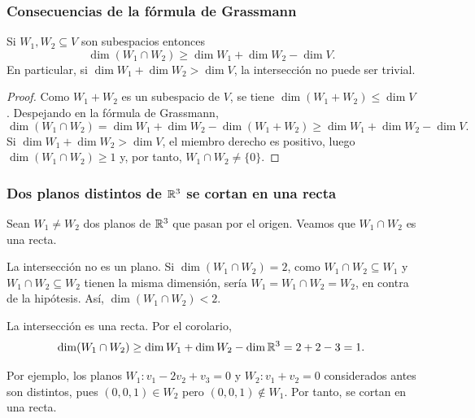 \begin{frame}
    \frametitle{Consecuencias de la fórmula de Grassmann}

    \begin{corollary}
        Si $W_1,W_2\subseteq V$ son subespacios entonces
        \[
            \dim(W_1\cap W_2)\geq\dim W_1+\dim W_2-\dim V.
        \]
        En particular, si $\dim W_1+\dim W_2>\dim V$, la intersección
        no puede ser trivial.
    \end{corollary}

    \begin{proof}
        Como $W_1+W_2$ es un subespacio de $V$, se tiene
        $\dim(W_1+W_2)\leq\dim V$. Despejando en la fórmula de Grassmann,
        \[
            \dim(W_1\cap W_2)=\dim W_1+\dim W_2-\dim(W_1+W_2)
            \geq\dim W_1+\dim W_2-\dim V.
        \]
        Si $\dim W_1+\dim W_2>\dim V$, el miembro derecho es positivo, luego
        $\dim(W_1\cap W_2)\geq1$ y, por tanto, $W_1\cap W_2\neq\{0\}$.
    \end{proof}
\end{frame}


\begin{frame}
    \frametitle{Dos planos distintos de $\mathbb{R}^3$ se cortan en una recta}

    \begin{example}
        Sean $W_1\neq W_2$ dos planos de $\mathbb{R}^3$ que pasan por el origen.
        Veamos que $W_1\cap W_2$ es una recta.
    \end{example}

    \alert{La intersección no es un plano.} Si $\dim(W_1\cap W_2)=2$, como
    $W_1\cap W_2\subseteq W_1$ y $W_1\cap W_2\subseteq W_2$ tienen la misma
    dimensión, sería $W_1=W_1\cap W_2=W_2$, en contra de la hipótesis.
    Así, $\dim(W_1\cap W_2)<2$.

    \medskip

    \alert{La intersección es una recta.} Por el corolario,
    \[
        \dim(W_1\cap W_2)\geq\dim W_1+\dim W_2-\dim\mathbb{R}^3=2+2-3=1.
    \]

    \medskip

    Por ejemplo, los planos $W_1\colon v_1-2v_2+v_3=0$ y
    $W_2\colon v_1+v_2=0$ considerados antes son distintos, pues $(0,0,1)\in W_2$ pero
    $(0,0,1)\notin W_1$. Por tanto, se cortan en una recta.
\end{frame}


